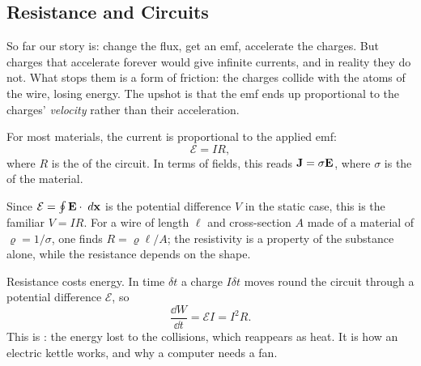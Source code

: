 \documentclass[a4paper]{scrartcl}
\begin{document}
\subsection{Resistance and Circuits}

So far our story is: change the flux, get an emf, accelerate the charges. But charges that accelerate forever would give infinite currents, and in reality they do not. What stops them is a form of friction: the charges collide with the atoms of the wire, losing energy. The upshot is that the emf ends up proportional to the charges' \emph{velocity} rather than their acceleration.

\begin{law}
	For most materials, the current is proportional to the applied emf:
	$$
	\mathcal{E} = IR,
	$$
	where $R$ is the  of the circuit. In terms of fields, this reads $\mathbf{J} = \sigma \mathbf{E}$, where $\sigma$ is the  of the material.
\end{law}

Since $\mathcal{E} = \oint \mathbf{E}\cdot \; d \mathbf{x}$ is the potential difference $V$ in the static case, this is the familiar $V = IR$. For a wire of length $\ell$ and cross-section $A$ made of a material of  $\varrho = 1/\sigma$, one finds $R = \varrho \ell /A$; the resistivity is a property of the substance alone, while the resistance depends on the shape.

Resistance costs energy. In time $\delta t$ a charge $I\delta t$ moves round the circuit through a potential difference $\mathcal{E}$, so
$$
\frac{\dd W}{\dd t} = \mathcal{E}I = I^2 R.
$$
This is : the energy lost to the collisions, which reappears as heat. It is how an electric kettle works, and why a computer needs a fan.
\end{document}
